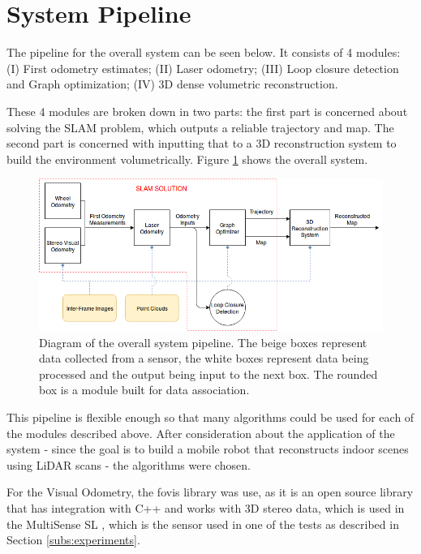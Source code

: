 \documentclass[12pt]{article}
\begin{document}
	\newpage
	\section{System Pipeline} \label{pipeline}

The pipeline for the overall system can be seen below. It consists of 4 modules: (I) First odometry estimates; (II) Laser odometry; (III) Loop closure detection and Graph optimization; (IV) 3D dense volumetric reconstruction.

These 4 modules are broken down in two parts: the first part is concerned about solving the SLAM problem, which outputs a reliable trajectory and map. The second part is concerned with inputting that to a 3D reconstruction system to build the environment volumetrically. Figure \ref{fig:SystemPipelineFigure1} shows the overall system.

\begin{figure}[h]
\includegraphics[width=\linewidth]{SystemPipeline}
\caption{Diagram of the overall system pipeline. The beige boxes represent data collected from a sensor, the white boxes represent data being processed and the output being input to the next box. The rounded box is a module built for data association.}
\label{fig:SystemPipelineFigure1}
\end{figure}
	
This pipeline is flexible enough so that many algorithms could be used for each of the modules described above. After consideration about the application of the system - since the goal is to build a mobile robot that reconstructs indoor scenes using LiDAR scans - the algorithms were chosen.
	
For the Visual Odometry, the fovis library \cite{fovis} was use, as it is an open source library that has integration with C++ and works with 3D stereo data, which is used in the MultiSense SL \cite{multisense}, which is the sensor used in one of the tests as described in Section \ref{subs:experiments}.
	
\end{document}
